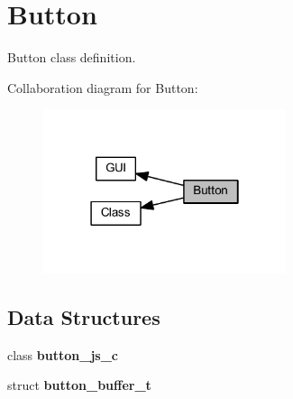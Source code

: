 \section{Button}
\label{group___button}


Button class definition.  


Collaboration diagram for Button\+:
\nopagebreak
\begin{figure}[H]
\begin{center}
\leavevmode
\includegraphics[width=202pt]{group___button}
\end{center}
\end{figure}
\subsection*{Data Structures}
\begin{DoxyCompactItemize}
\item 
class \textbf{ button\+\_\+js\+\_\+c}
\item 
struct \textbf{ button\+\_\+buffer\+\_\+t}
\end{DoxyCompactItemize}
